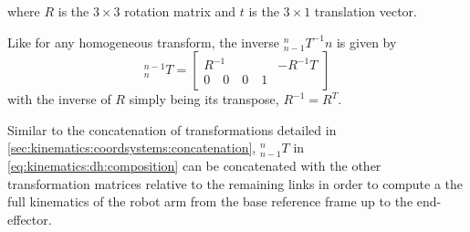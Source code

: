 where $R$ is the $3\times3$ rotation matrix and $t$ is the $3\times1$ translation vector.

Like for any homogeneous transform, the inverse $_{n-1}^nT^{-1}n$ is given by
\begin{equation}
^{n-1}_nT=\left[
\begin{array}{c|c}
R^{-1} & -R^{-1}T\\
\hline
0 \quad 0 \quad 0 \quad 1
\end{array}
\right]
\end{equation}
with the inverse of $R$ simply being its transpose, $R^{-1}=R^T$.

Similar to the concatenation of transformations detailed in \cref{sec:kinematics:coordsystems:concatenation}, $_{n-1}^nT$ in \cref{eq:kinematics:dh:composition} can be concatenated with the other transformation matrices relative to the remaining links in order to compute a the full kinematics of the robot arm from the base reference frame up to the end-effector.
